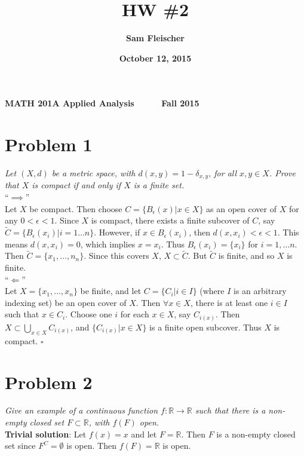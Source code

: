 \documentclass[12pt]{article}
\title{\bf HW \#2}
\author{\bf Sam Fleischer}
\date{\bf October 12, 2015}
\begin{document}
{\bf MATH 201A \hfill Applied Analysis \ \ \ \ \ \hfill Fall 2015} 

{\let\newpage\relax\maketitle}

\section*{Problem 1}
{\it Let $(X,d)$ be a metric space, with $d(x, y) = 1 - \delta_{x,y}$, for all $x,y \in X$.  Prove that $X$ is compact if and only if $X$ is a finite set.} \\

\noindent ``$\implies$'' \\

Let $X$ be compact.  Then choose $C = \{B_{\epsilon}(x) | x\in X\}$ as an open cover of $X$ for any $0 < \epsilon < 1$.  Since $X$ is compact, there exists a finite subcover of $C$, say $\tilde{C} = \{B_{\epsilon}(x_i) | i=1\dots n\}$.  However, if $x \in B_{\epsilon}(x_i)$, then $d(x, x_i) < \epsilon < 1$.  This means $d(x, x_i) = 0$, which implies $x = x_i$.  Thus $B_{\epsilon}(x_i) = \{x_i\}$ for $i = 1, \dots n$.  Then $\tilde{C} = \{x_1,\dots,n_n\}$.  Since this covers $X$, $X \subset \tilde{C}$.  But $\tilde{C}$ is finite, and so $X$ is finite. \\

\noindent ``$\Longleftarrow$'' \\

Let $X = \{x_1, \dots, x_n\}$ be finite, and let $C = \{C_i|i\in I\}$ (where $I$ is an arbitrary indexing set) be an open cover of $X$.  Then $\forall x \in X$, there is at least one $i \in I$ such that $x \in C_i$.  Choose one $i$ for each $x \in X$, say $C_{i(x)}$.  Then $X \subset \bigcup_{x\in X}C_{i(x)}$, and $\{C_{i(x)}| x \in X\}$ is a finite open subcover.  Thus $X$ is compact. \hfill $\square$

\section*{Problem 2}
{\it Give an example of a continuous function $f : \mathbb{R} \rightarrow \mathbb{R}$ such that there is a non-empty closed set $F \subset \mathbb{R}$, with $f(F)$ open.} \\

\noindent\textbf{Trivial solution}: Let $f(x) = x$ and let $F = \mathbb{R}$.  Then $F$ is a non-empty closed set since $F^C = \emptyset$ is open.  Then $f(F) = \mathbb{R}$ is open.
\end{document}
